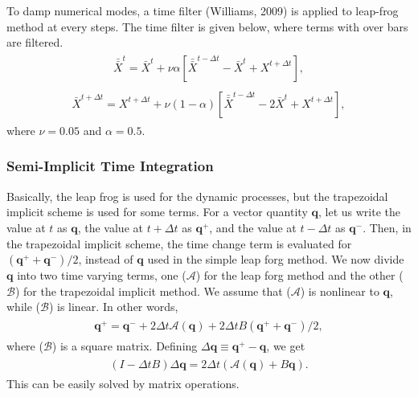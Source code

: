 To damp numerical modes, a time filter (Williams, 2009) is applied to leap-frog method at every steps. The time filter is given below, where terms with over bars are filtered. \begin{eqnarray}\begin{aligned}
\bar{\bar{X}}^{t} = \bar{X}^{t} + \nu \alpha [\bar{\bar{X}}^{t-\Delta t} - \bar{X}^{t} + X^{t+\Delta t}],\end{aligned}\end{eqnarray} \begin{eqnarray}\begin{aligned}
\bar{X}^{t+\Delta t} = X^{t+\Delta t} + \nu (1-\alpha) [\bar{\bar{X}}^{t-\Delta t} - 2 \bar{X}^{t} + X^{t+\Delta t}],\end{aligned}\end{eqnarray} where \(\nu=0.05\) and \(\alpha=0.5\).

\hypertarget{semi-implicit-time-integration}{%
\subsubsection{Semi-Implicit Time Integration}\label{semi-implicit-time-integration}}

Basically, the leap frog is used for the dynamic processes, but the trapezoidal implicit scheme is used for some terms. For a vector quantity \({\mathbf q}\), let us write the value at \(t\) as
\({\mathbf q}\), the value at \(t+\Delta t\) as \({\mathbf q}^+\), and the value at \(t-\Delta t\) as \({\mathbf q}^-\). Then, in the trapezoidal implicit scheme, the time change term is evaluated for
\(({\mathbf q}^+ + {\mathbf q}^- )/2\), instead of \({\mathbf q}\) used in the simple leap forg method. We now divide \({\mathbf q}\) into two time varying terms, one (\({\mathcal A}\)) for the leap
forg method and the other (\({\mathcal B}\)) for the trapezoidal implicit method. We assume that (\({\mathcal A}\)) is nonlinear to \({\mathbf q}\), while (\({\mathcal B}\)) is linear. In other words,
\begin{eqnarray}\begin{aligned}
  {\mathbf q}^+
      = {\mathbf q}^-
      + 2 \Delta t {\mathcal A}( {\mathbf q}  )
      + 2 \Delta t B (   {\mathbf q}^+
                       + {\mathbf q}^-   )/2,\end{aligned}\end{eqnarray} where (\({\mathcal B}\)) is a square matrix. Defining \(\Delta {\mathbf q} \equiv {\mathbf q}^+ - {\mathbf q}\), we get \begin{eqnarray}\begin{aligned}
  ( I - \Delta t B ) \Delta {\mathbf q}
      = 2 \Delta t \left( {\mathcal A}({\mathbf q})
                         + B {\mathbf q} \right).\end{aligned}\end{eqnarray} This can be easily solved by matrix operations.

